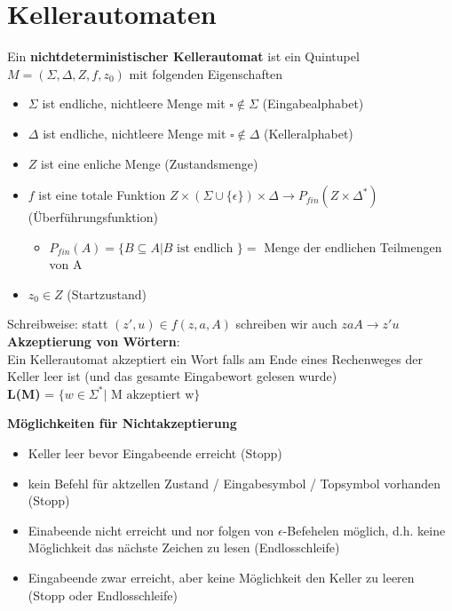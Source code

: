 \documentclass[14pt]{article}
\begin{document}
\section{Kellerautomaten}
\begin{definition}
    Ein \textbf{nichtdeterministischer Kellerautomat} ist ein Quintupel 
    $M = (\varSigma, \varDelta, Z, f, z_0)$ mit folgenden Eigenschaften
    \begin{itemize}
        \item $\varSigma$ ist endliche, nichtleere Menge mit $\square \notin \varSigma$
        (Eingabealphabet)
        \item $\varDelta$ ist endliche, nichtleere Menge mit $\square \notin \varDelta$
        (Kelleralphabet)
        \item $Z$ ist eine enliche Menge (Zustandsmenge)
        \item $f$ ist eine totale Funktion $Z \times (\varSigma \cup \{ \epsilon \}) \times
        \varDelta \rightarrow P_{fin}(Z \times \varDelta^*)$ (Überführungsfunktion) 
        \begin{itemize}
            \item $P_{fin}(A) = \{ B \subseteq A | B \text{ ist endlich }\} = $ Menge der
            endlichen Teilmengen von A
        \end{itemize}
        \item $z_0 \in Z$ (Startzustand)
    \end{itemize}
    Schreibweise: statt $(z', u) \in f(z, a, A)$ schreiben wir auch $zaA \rightarrow z'u$ \\
    \textbf{Akzeptierung von Wörtern}: \\
    Ein Kellerautomat akzeptiert ein Wort falls am Ende eines Rechenweges der Keller leer ist
    (und das gesamte Eingabewort gelesen wurde) \\
    \textbf{L(M)} = $\{ w \in \varSigma^* | \text{ M akzeptiert w}\}$
\end{definition}
\textbf{Möglichkeiten für Nichtakzeptierung}
\begin{itemize}
    \item Keller leer bevor Eingabeende erreicht (Stopp)
    \item kein Befehl für aktzellen Zustand / Eingabesymbol / Topsymbol vorhanden (Stopp)
    \item Einabeende nicht erreicht und nor folgen von $\epsilon$-Befehelen möglich, d.h. 
    keine Möglichkeit das nächste Zeichen zu lesen (Endlosschleife)
    \item Eingabeende zwar erreicht, aber keine Möglichkeit den Keller zu leeren 
    (Stopp oder Endlosschleife)
\end{itemize}
\end{document}
